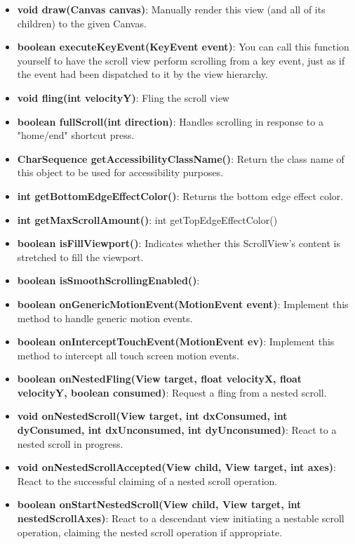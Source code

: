 \documentclass{report}
\begin{document}
\begin{itemize}
\begin{itemize}
\begin{itemize}
                \item \textbf{void	draw(Canvas canvas)}: Manually render this view (and all of its children) to the given Canvas.
                \item \textbf{boolean	executeKeyEvent(KeyEvent event)}: You can call this function yourself to have the scroll view perform scrolling from a key event, just as if the event had been dispatched to it by the view hierarchy.
                \item \textbf{void	fling(int velocityY)}: Fling the scroll view
                \item \textbf{boolean	fullScroll(int direction)}: Handles scrolling in response to a "home/end" shortcut press.
                \item \textbf{CharSequence	getAccessibilityClassName()}: Return the class name of this object to be used for accessibility purposes.
                \item \textbf{int	getBottomEdgeEffectColor()}: Returns the bottom edge effect color.
                \item \textbf{int	getMaxScrollAmount()}: int	getTopEdgeEffectColor()
                \item \textbf{boolean	isFillViewport()}: Indicates whether this ScrollView's content is stretched to fill the viewport.
                \item \textbf{boolean	isSmoothScrollingEnabled()}:
                \item \textbf{boolean	onGenericMotionEvent(MotionEvent event)}: Implement this method to handle generic motion events.
                \item \textbf{boolean	onInterceptTouchEvent(MotionEvent ev)}: Implement this method to intercept all touch screen motion events.
                \item \textbf{boolean	onNestedFling(View target, float velocityX, float velocityY, boolean consumed)}: Request a fling from a nested scroll.
                \item \textbf{void	onNestedScroll(View target, int dxConsumed, int dyConsumed, int dxUnconsumed, int dyUnconsumed)}: React to a nested scroll in progress.
                \item \textbf{void	onNestedScrollAccepted(View child, View target, int axes)}: React to the successful claiming of a nested scroll operation.
                \item \textbf{boolean	onStartNestedScroll(View child, View target, int nestedScrollAxes)}: React to a descendant view initiating a nestable scroll operation, claiming the nested scroll operation if appropriate.

\end{itemize}
\end{itemize}
\end{itemize}
\end{document}
